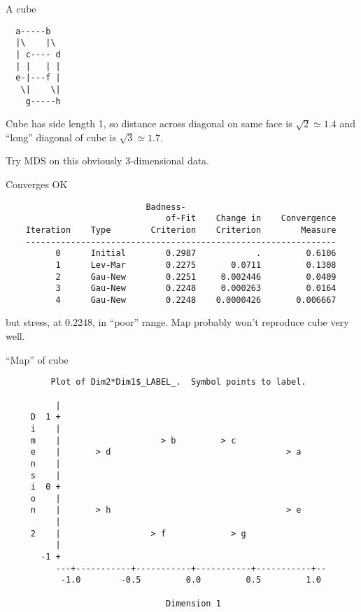 \documentclass[pdf]{prosper}
\begin{document}
\begin{slide}{A cube}

\begin{verbatim}
  a-----b
  |\    |\
  | c---- d
  | |   | |
  e-|---f |
   \|    \|
    g-----h
\end{verbatim}

Cube has side length 1, so distance across diagonal on same face is $\sqrt{2}\simeq 1.4$ and ``long'' diagonal of cube is $\sqrt{3}\simeq 1.7$. 
  
\vspace{3ex}

Try MDS on this obviously 3-dimensional data.

\end{slide}

\begin{slide}{Converges OK}

{\scriptsize
\begin{verbatim}
                            Badness-
                                of-Fit    Change in    Convergence
    Iteration    Type        Criterion    Criterion        Measure
    --------------------------------------------------------------
          0      Initial        0.2987            .         0.6106
          1      Lev-Mar        0.2275       0.0711         0.1308
          2      Gau-New        0.2251     0.002446         0.0409
          3      Gau-New        0.2248     0.000263         0.0164
          4      Gau-New        0.2248    0.0000426       0.006667
\end{verbatim}
}

but stress, at 0.2248, in ``poor'' range. Map probably won't reproduce cube very well.
  
\end{slide}

\begin{slide}{``Map'' of cube}

{\scriptsize
\begin{verbatim}
         Plot of Dim2*Dim1$_LABEL_.  Symbol points to label.

          |
     D  1 +
     i    |
     m    |                    > b         > c
     e    |       > d                                   > a
     n    |
     s    |
     i  0 +
     o    |
     n    |       > h                                   > e
          |
     2    |                  > f             > g
          |
       -1 +
          ---+-----------+-----------+-----------+-----------+--
           -1.0        -0.5         0.0         0.5         1.0

                                Dimension 1

\end{verbatim}
}


  
\end{slide}
\end{document}
